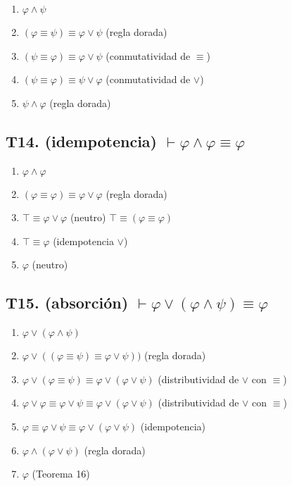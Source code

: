 \documentclass[a4paper,11pt]{article}
\begin{document}
\begin{enumerate}
    \item $\varphi \land \psi$
    \item $(\varphi \equiv \psi) \equiv \varphi \lor \psi$ \hfill (regla dorada)
    \item $(\psi \equiv \varphi) \equiv \varphi \lor \psi$ \hfill (conmutatividad de $\equiv$)
    \item $(\psi \equiv \varphi) \equiv \psi \lor \varphi$ \hfill (conmutatividad de $\lor$)
    \item $\psi \land \varphi$ \hfill (regla dorada)
\end{enumerate}

\subsection{T14. (idempotencia) $\vdash \varphi \land \varphi \equiv \varphi$}

\begin{enumerate}
    \item $\varphi \land \varphi$
    \item $(\varphi \equiv \varphi) \equiv \varphi \lor \varphi$ \hfill (regla dorada)
    \item $\top \equiv \varphi \lor \varphi$ \hfill (neutro) $\top \equiv (\varphi \equiv \varphi)$
    \item $\top \equiv \varphi$ \hfill (idempotencia $\lor$)
    \item $\varphi$ \hfill (neutro)
\end{enumerate}

\subsection{T15. (absorción) $\vdash \varphi \lor (\varphi \land \psi) \equiv \varphi $}

\begin{enumerate}
    \item $\varphi \lor (\varphi \land \psi)$
    \item $\varphi \lor ((\varphi \equiv \psi) \equiv \varphi \lor \psi))$ \hfill (regla dorada)
    \item $\varphi \lor (\varphi \equiv \psi) \equiv \varphi \lor (\varphi \lor \psi)$ \hfill (distributividad de $\lor$ con $\equiv$)
    \item $\varphi \lor \varphi \equiv \varphi \lor \psi \equiv \varphi \lor (\varphi \lor \psi)$ \hfill (distributividad de $\lor$ con $\equiv$)
    \item $\varphi \equiv \varphi \lor \psi \equiv \varphi \lor (\varphi \lor \psi)$ \hfill (idempotencia)
    \item $\varphi \land (\varphi \lor \psi)$ \hfill (regla dorada)
    \item $\varphi$ \hfill (Teorema 16)
\end{enumerate}
\end{document}
